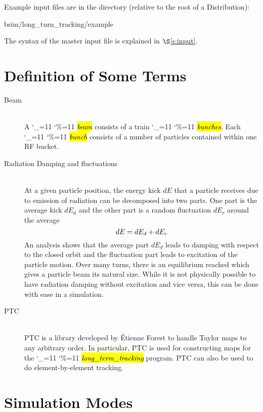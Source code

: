 \documentclass{hitec}
\newcommand\dottcmd[1]{\hl{\em#1}\endgroup}
\newcommand{\vn}{\begingroup\catcode`\_=11 \catcode`\%=11 \dottcmd}
\newcommand{\Newline}{\hfil \\}
\newcommand{\sref}[1]{$\S$\ref{#1}}
\newcommand{\Section}[1]{\section{#1}\vspace*{-1ex}}
\begin{document}
Example input files are in the directory (relative to the root of a Distribution):
\begin{code}
  bsim/long_turn_tracking/example
\end{code}

The syntax of the master input file is explained in \sref{s:input}.

\Section{Definition of Some Terms}
\label{s:def}

\begin{description}
\item[Beam] \Newline
A \vn{beam} consists of a train \vn{bunches}. Each \vn{bunch} consists of a number of particles contained
within one RF bucket.
%
\item[Radiation Damping and fluctuations] \Newline
At a given particle position, the energy kick $dE$ that a particle receives due to emission of
radiation can be decomposed into two parts. One part is the average kick $dE_d$ and the other part
is a random fluctuation $dE_r$ around the average 
\begin{equation}\large
  dE = dE_d + dE_r
\end{equation}
An analysis shows that the average part $dE_d$ leads to damping with respect to the closed orbit and
the fluctuation part leads to excitation of the particle motion. Over many turns, there is an
equilibrium reached which gives a particle beam its natural size. While it is not physically
possible to have radiation damping without excitation and vice versa, this can be done with ease in
a simulation.
%
\item[PTC] \Newline
PTC is a library developed by \'Etienne Forest to handle Taylor maps to any arbitrary order. In
particular, PTC is used for constructing maps for the \vn{long_term_tracking} program. PTC can also
be used to do element-by-element tracking.
\end{description}

\Section{Simulation Modes}
\label{s:sim.modes}
\end{document}
